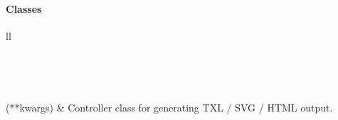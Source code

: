 \documentclass[letterpaper,10pt,english]{sphinxmanual}
\begin{document}
\paragraph{Classes}
\label{Chapters/PythonModuleReference/TXLWriter/TXLWizard.TXLWriter:classes}
\begin{longtable}{ll}
\hline
\endfirsthead

%
{{}} \\
\hline
\endhead

\hline {} \\ \hline
\endfoot

\endlastfoot


{\hyperref[Chapters/PythonModuleReference/TXLWriter/TXLWizard.TXLWriter:TXLWizard.TXLWriter.TXLWriter]{}}(**kwargs)
 & 
Controller class for generating TXL / SVG / HTML output.
\\
\hline\end{longtable}

\end{document}
